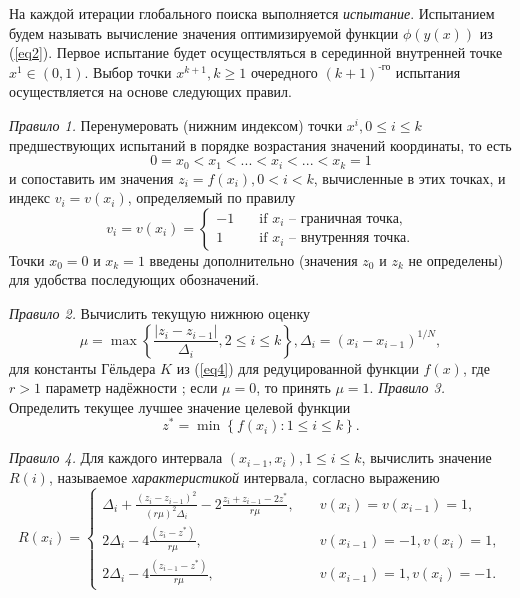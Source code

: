 \documentclass[10pt,a4paper]{book}
\begin{document}
На каждой итерации глобального поиска выполняется \textit{испытание}. Испытанием будем называть вычисление значения оптимизируемой функции $\phi (y(x))$ из (\ref{eq2}). Первое испытание будет осуществляться в серединной внутренней точке $x^1 \in (0,1)$. Выбор точки $x^{k+1}, k \geq 1$ очередного $(k+1)^\text{-го}$ испытания осуществляется на основе следующих правил.

\textit{Правило 1.} Перенумеровать (нижним индексом) точки $x^i, 0 \leq i \leq k$ предшествующих испытаний в порядке возрастания значений координаты, то есть
\begin{equation}\label{eq5} 
0=x_0 < x_1 < ... < x_i < ... < x_{k}=1
\end{equation}
и сопоставить им значения $z_i=f(x_i), 0 < i < k$, вычисленные в этих точках, и индекс $v_i=v(x_i)$, определяемый по правилу
\begin{equation}\label{eq6} 
v_i=v(x_i)=
  \begin{cases}
    -1 & {\quad \text{if } x_i \text{ -- граничная точка,}}\\
    1  & {\quad \text{if } x_i \text{ -- внутренняя точка.}}
  \end{cases}
\end{equation}
Точки $x_0=0$ и $x_{k}=1$ введены дополнительно (значения $z_0$ и $z_{k}$ не определены) для удобства последующих обозначений.

\textit{Правило 2.} Вычислить текущую нижнюю оценку
\begin{equation}\label{eq7} 
\mu = \max\left\{ \frac{|z_i-z_{i-1}|}{\Delta _i}, 2 \leq i \leq k \right\} , \Delta _i= (x_i-x_{i-1})^{1/N},
\end{equation}
для константы Гёльдера $K$ из (\ref{eq4}) для редуцированной функции $f(x)$, где $r>1$ параметр надёжности ; если $\mu=0$, то принять $\mu=1$.
\textit{Правило 3.} Определить текущее лучшее значение целевой функции
\begin{equation}\label{eq8} 
z^*=\min \left\{ f(x_i): 1\leq i \leq k \right\}.
\end{equation}

\textit{Правило 4.} Для каждого интервала $(x_{i-1},x_i),1 \leq i \leq k$, вычислить значение $R(i)$, называемое \textit{характеристикой} интервала, согласно выражению
\begin{equation}\label{eq9} 
R(x_i)=
  \begin{cases}
    \Delta _i+\frac {{(z_i-z_{i-1})}^2}{{(r \mu)}^2 \Delta _i} - 2 \frac {z_i+z_{i-1}-2z^*}{r \mu}, & {\quad  v(x_i)=v(x_{i-1})=1},\\
    2 \Delta _i-4 \frac {(z_i-z^*)}{r \mu}, & {\quad  v(x_{i-1})=-1, v(x_i)=1},\\
    2 \Delta _i-4 \frac {(z_{i-1}-z^*)}{r \mu}, & {\quad  v(x_{i-1})=1, v(x_i)=-1.}
  \end{cases}
\end{equation}
\end{document}
